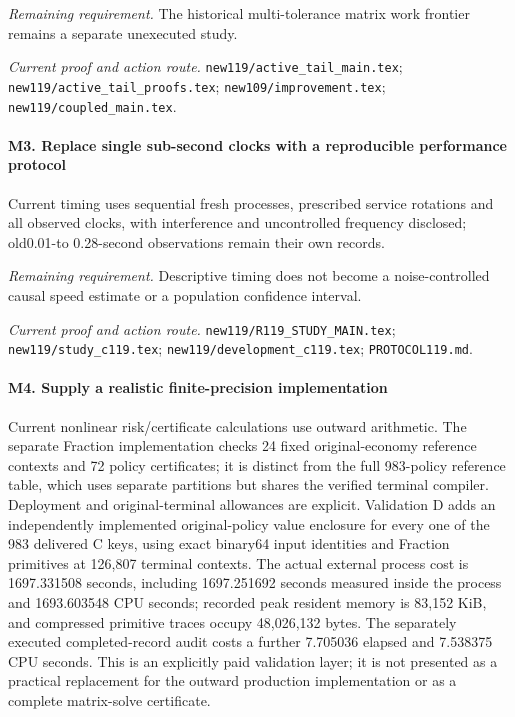 \par\emph{Remaining requirement.} The historical multi-tolerance matrix work frontier remains a separate unexecuted study.

\par\emph{Current proof and action route.} \nolinkurl{new119/active_tail_main.tex}; \nolinkurl{new119/active_tail_proofs.tex}; \nolinkurl{new109/improvement.tex}; \nolinkurl{new119/coupled_main.tex}.

\paragraph{M3. Replace single sub-second clocks with a reproducible performance protocol}

Current timing uses sequential fresh processes, prescribed service rotations and all observed clocks, with interference and uncontrolled frequency disclosed; old0.01-to 0.28-second observations remain their own records.

\par\emph{Remaining requirement.} Descriptive timing does not become a noise-controlled causal speed estimate or a population confidence interval.

\par\emph{Current proof and action route.} \nolinkurl{new119/R119_STUDY_MAIN.tex}; \nolinkurl{new119/study_c119.tex}; \nolinkurl{new119/development_c119.tex}; \nolinkurl{PROTOCOL119.md}.

\paragraph{M4. Supply a realistic finite-precision implementation}

Current nonlinear risk/\allowbreak{}certificate calculations use outward arithmetic. The separate Fraction implementation checks 24 fixed original-economy reference contexts and 72 policy certificates; it is distinct from the full 983-policy reference table, which uses separate partitions but shares the verified terminal compiler. Deployment and original-terminal allowances are explicit. Validation D adds an independently implemented original-policy value enclosure for every one of the 983 delivered C keys, using exact binary64 input identities and Fraction primitives at 126,807 terminal contexts. The actual external process cost is 1697.331508 seconds, including 1697.251692 seconds measured inside the process and 1693.603548 CPU seconds; recorded peak resident memory is 83,152 KiB, and compressed primitive traces occupy 48,026,132 bytes. The separately executed completed-record audit costs a further 7.705036 elapsed and 7.538375 CPU seconds. This is an explicitly paid validation layer; it is not presented as a practical replacement for the outward production implementation or as a complete matrix-solve certificate.

